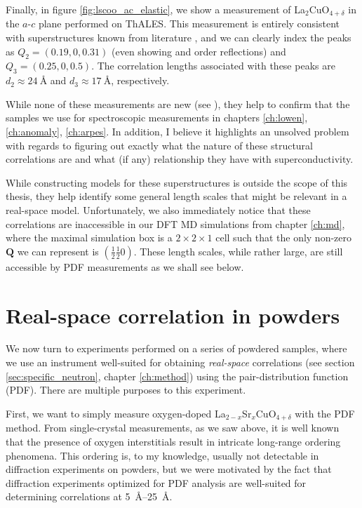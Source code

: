 Finally, in figure \ref{fig:lscoo_ac_elastic}, we show a measurement of La$_2$CuO$_{4+\delta}$ in the $a$-$c$ plane performed on ThALES. This measurement is entirely consistent with superstructures known from literature \cite{Kusmartsev2000}, and we can clearly index the peaks as $Q_2 = (0.19, 0, 0.31)$ (even showing  and  order reflections) and $Q_3 = (0.25,0,0.5)$. The correlation lengths associated with these peaks are $d_2 \approx \SI{24}{\angstrom}$ and $d_3 \approx \SI{17}{\angstrom}$, respectively.

While none of these measurements are new (see \cite[Chapter 10]{Ray2016}), they help to confirm that the samples we use for spectroscopic measurements in chapters \ref{ch:lowen}, \ref{ch:anomaly}, \ref{ch:arpes}. In addition, I believe it highlights an unsolved problem with regards to figuring out exactly what the nature of these structural correlations are and what (if any) relationship they have with superconductivity.

While constructing models for these superstructures is outside the scope of this thesis, they help identify some general length scales that might be relevant in a real-space model. Unfortunately, we also immediately notice that these correlations are inaccessible in our DFT MD simulations from chapter \ref{ch:md}, where the maximal simulation box is a $2 \times 2 \times 1$ cell such that the only non-zero $\bm{Q}$ we can represent is $(\frac{1}{2}\frac{1}{2}{0})$. These length scales, while rather large, are still accessible by PDF measurements as we shall see below.

\section{Real-space correlation in powders}
We now turn to experiments performed on a series of powdered samples, where we use an instrument well-suited for obtaining \emph{real-space} correlations (see section \ref{sec:specific_neutron}, chapter \ref{ch:method}) using the pair-distribution function (PDF). There are multiple purposes to this experiment. 

First, we want to simply measure oxygen-doped La$_{2-x}$Sr$_x$CuO$_{4+\delta}$ with the PDF method. From single-crystal measurements, as we saw above, it is well known that the presence of oxygen interstitials result in intricate long-range ordering phenomena. This ordering is, to my knowledge, usually not detectable in diffraction experiments on powders, but we were motivated by the fact that diffraction experiments optimized for PDF analysis are well-suited for determining correlations at \SIrange{5}{25}{\angstrom}.

